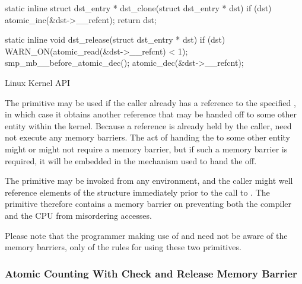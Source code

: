 \begin{listing}
\begin{fcvlabel}
\begin{VerbatimL}[commandchars=\\\[\]]
static inline
struct dst_entry * dst_clone(struct dst_entry * dst)
{
	if (dst)
		atomic_inc(&dst->__refcnt);
	return dst;
}

static inline
void dst_release(struct dst_entry * dst)
{
	if (dst) {
		WARN_ON(atomic_read(&dst->__refcnt) < 1);
		smp_mb__before_atomic_dec();		\lnlbl[mb]
		atomic_dec(&dst->__refcnt);
	}
}
\end{VerbatimL}
\end{fcvlabel}
\caption{Linux Kernel  API}
\label{lst:together:Linux Kernel dst-clone API}
\end{listing}

The  primitive may be used if the caller
already has a reference to the specified ,
in which case it obtains another reference that may be handed off
to some other entity within the kernel.
Because a reference is already held by the caller, 
need not execute any memory barriers.
The act of handing the  to some other entity might
or might not require a memory barrier, but if such a memory barrier
is required, it will be embedded in the mechanism used to hand the
 off.

\begin{fcvref}
The  primitive may be invoked from any environment,
and the caller might well reference elements of the 
structure immediately prior to the call to .
The  primitive therefore contains a memory
barrier on  preventing both the compiler and the CPU
from misordering accesses.
\end{fcvref}

Please note that the programmer making use of  and
 need not be aware of the memory barriers, only
of the rules for using these two primitives.

\subsubsection{Atomic Counting With Check and Release Memory Barrier}
\label{sec:together:Atomic Counting With Check and Release Memory Barrier}

